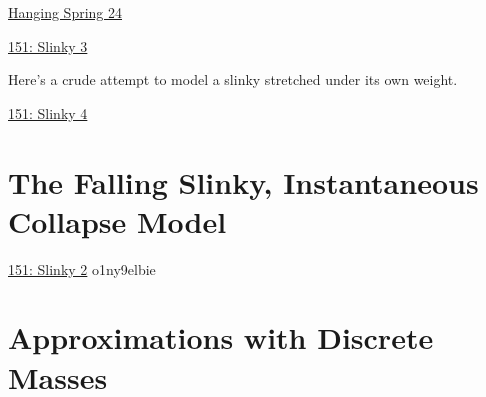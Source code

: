 \documentclass{ximera}
\begin{document}
\href{https://www.desmos.com/calculator/7kykohyoic}{Hanging Spring 24}



\begin{onlineOnly}
    \begin{center}
\end{center}
\end{onlineOnly}

\href{https://www.desmos.com/calculator/vjjibjkdrz}{151: Slinky 3}

Here's a crude attempt to model a slinky stretched under its own weight.

\begin{onlineOnly}
    \begin{center}
\end{center}
\end{onlineOnly}

\href{https://www.desmos.com/calculator/o1ny9elbie}{151: Slinky 4}


\section{The Falling Slinky, Instantaneous Collapse Model}




\begin{onlineOnly}
    \begin{center}
\end{center}
\end{onlineOnly}

\href{https://www.desmos.com/calculator/fahf3t461i}{151: Slinky 2}
o1ny9elbie


\section{Approximations with Discrete Masses}
\end{document}
